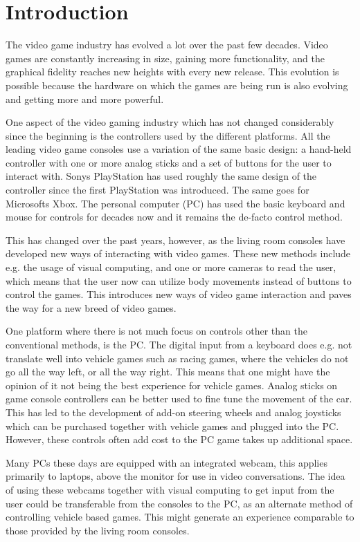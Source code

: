 \section{Introduction}
The video game industry has evolved a lot over the past few decades. Video games are constantly increasing in size, gaining more functionality, and the graphical fidelity reaches new heights with every new release. This evolution is possible because the hardware on which the games are being run is also evolving and getting more and more powerful.
\bigskip

One aspect of the video gaming industry which has not changed considerably since the beginning is the controllers used by the different platforms. All the leading video game consoles use a variation of the same basic design: a hand-held controller with one or more analog sticks and a set of buttons for the user to interact with. Sonys PlayStation has used roughly the same design of the controller since the first PlayStation was introduced. The same goes for Microsofts Xbox. The personal computer (PC) has used the basic keyboard and mouse for controls for decades now and it remains the de-facto control method.
\bigskip

This has changed over the past years, however, as the living room consoles have developed new ways of interacting with video games. These new methods include e.g. the usage of visual computing, and one or more cameras to read the user, which means that the user now can utilize body movements instead of buttons to control the games. This introduces new ways of video game interaction and paves the way for a new breed of video games.
\bigskip

One platform where there is not much focus on controls other than the conventional methods, is the PC. The digital input from a keyboard does e.g. not translate well into vehicle games such as racing games, where the vehicles do not go all the way left, or all the way right. This means that one might have the opinion of it not being the best experience for vehicle games. Analog sticks on game console controllers can be better used to fine tune the movement of the car. This has led to the development of add-on steering wheels and analog joysticks which can be purchased together with vehicle games and plugged into the PC. However, these controls often add cost to the PC game takes up additional space.
\bigskip

Many PCs these days are equipped with an integrated webcam, this applies primarily to laptops, above the monitor for use in video conversations. The idea of using these webcams together with visual computing to get input from the user could be transferable from the consoles to the PC, as an alternate method of controlling vehicle based games. This might generate an experience comparable to those provided by the living room consoles.


